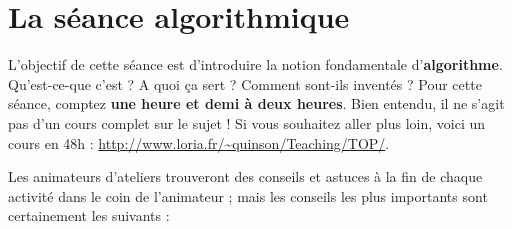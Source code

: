 \documentclass[a5paper,pagesize,DIV=14]{scrbook}
\begin{document}

\section*{La séance algorithmique}

L'objectif de cette séance est d'introduire la notion fondamentale
d'\textbf{al\-gorithme}. Qu'est-ce-que c'est ? A quoi ça sert ? Comment sont-ils
inventés ? Pour cette séance, comptez \textbf{une heure et demi à deux
  heures}. Bien entendu, il ne s'agit pas d'un cours complet sur le sujet ! Si
vous souhaitez aller plus loin, voici un cours en 48h :
\url{http://www.loria.fr/~quinson/Teaching/TOP/}.

Les animateurs d'ateliers trouveront des conseils et astuces à la fin de chaque
activité dans \og le coin de l'animateur \fg ; mais les conseils les plus
importants sont certainement les suivants :
\end{document}
